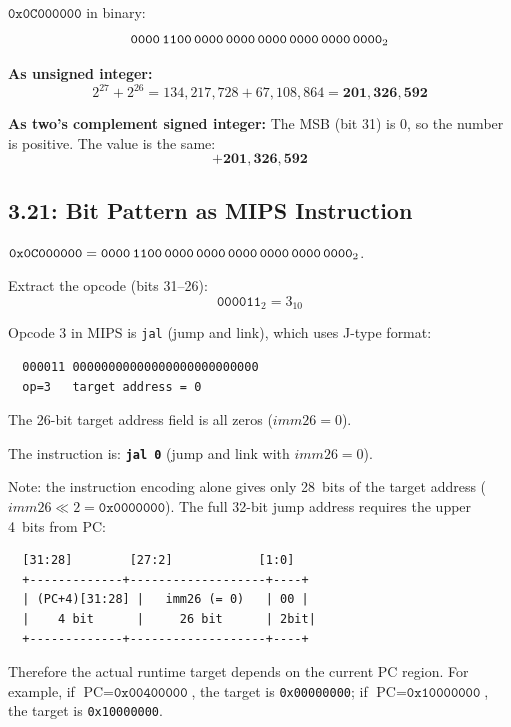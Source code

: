 $\texttt{0x0C000000}$ in binary:
\[
  \texttt{0000\,1100\,0000\,0000\,0000\,0000\,0000\,0000}_2
\]

\noindent\textbf{As unsigned integer:}
\[
  2^{27} + 2^{26} = 134{,}217{,}728 + 67{,}108{,}864 = \mathbf{201{,}326{,}592}
\]

\noindent\textbf{As two's complement signed integer:}
The MSB (bit 31) is 0, so the number is positive. The value is the same:
\[
  \mathbf{+201{,}326{,}592}
\]

\subsection*{3.21: Bit Pattern as MIPS Instruction}
\hypertarget{sol-3.21}{}

$\texttt{0x0C000000} = \texttt{0000\,1100\,0000\,0000\,0000\,0000\,0000\,0000}_2$.

Extract the opcode (bits 31--26):
\[
  \texttt{000011}_2 = 3_{10}
\]

Opcode 3 in MIPS is \texttt{jal} (jump and link), which uses J-type format:
\begin{verbatim}
  000011 00000000000000000000000000
  op=3   target address = 0
\end{verbatim}

The 26-bit target address field is all zeros ($\textit{imm26} = 0$).

The instruction is: \textbf{\texttt{jal 0}} (jump and link with
$\textit{imm26} = 0$).

\medskip
Note: the instruction encoding alone gives only 28~bits of the target
address ($\textit{imm26} \ll 2 = \texttt{0x0000000}$).
The full 32-bit jump address requires the upper 4~bits from PC:
\begin{verbatim}
  [31:28]        [27:2]            [1:0]
  +-------------+-------------------+----+
  | (PC+4)[31:28] |   imm26 (= 0)   | 00 |
  |    4 bit      |     26 bit      | 2bit|
  +-------------+-------------------+----+
\end{verbatim}
\vspace{-6pt}
Therefore the actual runtime target depends on the current PC region.
For example, if $\text{PC} = \texttt{0x00400000}$, the target is
\texttt{0x00000000}; if $\text{PC} = \texttt{0x10000000}$, the target
is \texttt{0x10000000}.

